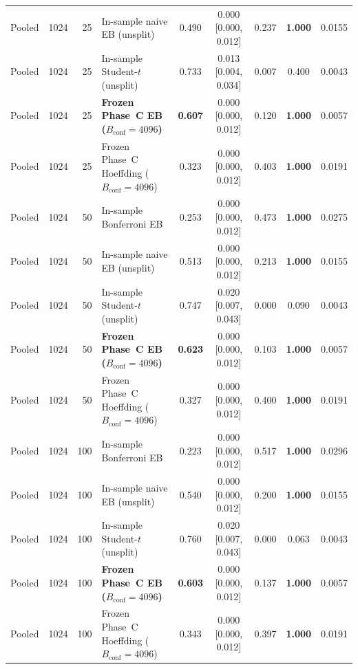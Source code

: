 \begin{table}[htbp]
\begin{tabular}{@{}l r r l c c c c c@{}}
Pooled & 1024 & 25 & In-sample naive EB (unsplit) & 0.490 & 0.000 [0.000, 0.012] & 0.237 & \textbf{1.000} & 0.0155 \\
Pooled & 1024 & 25 & In-sample Student-$t$ (unsplit) & 0.733 & 0.013 [0.004, 0.034] & 0.007 & 0.400 & 0.0043 \\
Pooled & 1024 & 25 & \textbf{Frozen Phase~C EB ($B_{\mathrm{conf}}=4096$)} & \textbf{0.607} & 0.000 [0.000, 0.012] & 0.120 & \textbf{1.000} & 0.0057 \\
Pooled & 1024 & 25 & Frozen Phase~C Hoeffding ($B_{\mathrm{conf}}=4096$) & 0.323 & 0.000 [0.000, 0.012] & 0.403 & \textbf{1.000} & 0.0191 \\
Pooled & 1024 & 50 & In-sample Bonferroni EB & 0.253 & 0.000 [0.000, 0.012] & 0.473 & \textbf{1.000} & 0.0275 \\
Pooled & 1024 & 50 & In-sample naive EB (unsplit) & 0.513 & 0.000 [0.000, 0.012] & 0.213 & \textbf{1.000} & 0.0155 \\
Pooled & 1024 & 50 & In-sample Student-$t$ (unsplit) & 0.747 & 0.020 [0.007, 0.043] & 0.000 & 0.090 & 0.0043 \\
Pooled & 1024 & 50 & \textbf{Frozen Phase~C EB ($B_{\mathrm{conf}}=4096$)} & \textbf{0.623} & 0.000 [0.000, 0.012] & 0.103 & \textbf{1.000} & 0.0057 \\
Pooled & 1024 & 50 & Frozen Phase~C Hoeffding ($B_{\mathrm{conf}}=4096$) & 0.327 & 0.000 [0.000, 0.012] & 0.400 & \textbf{1.000} & 0.0191 \\
Pooled & 1024 & 100 & In-sample Bonferroni EB & 0.223 & 0.000 [0.000, 0.012] & 0.517 & \textbf{1.000} & 0.0296 \\
Pooled & 1024 & 100 & In-sample naive EB (unsplit) & 0.540 & 0.000 [0.000, 0.012] & 0.200 & \textbf{1.000} & 0.0155 \\
Pooled & 1024 & 100 & In-sample Student-$t$ (unsplit) & 0.760 & 0.020 [0.007, 0.043] & 0.000 & 0.063 & 0.0043 \\
Pooled & 1024 & 100 & \textbf{Frozen Phase~C EB ($B_{\mathrm{conf}}=4096$)} & \textbf{0.603} & 0.000 [0.000, 0.012] & 0.137 & \textbf{1.000} & 0.0057 \\
Pooled & 1024 & 100 & Frozen Phase~C Hoeffding ($B_{\mathrm{conf}}=4096$) & 0.343 & 0.000 [0.000, 0.012] & 0.397 & \textbf{1.000} & 0.0191 \\
\bottomrule
\end{tabular}
\end{table}
